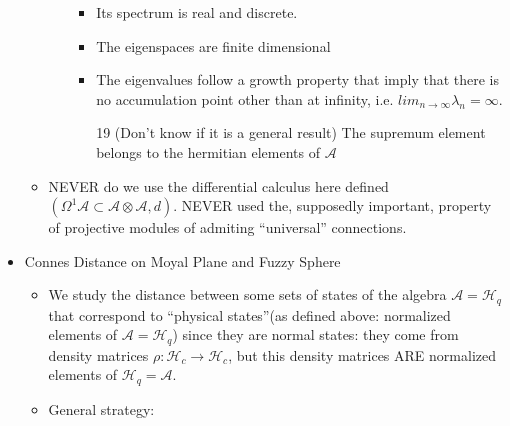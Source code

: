 \documentclass{article}
\begin{document}
\begin{itemize}
\begin{itemize}
\begin{itemize}
                \begin{itemize}
                    
                \item Its spectrum is real and discrete.
                
                \item The eigenspaces are finite dimensional
                
                \item The eigenvalues follow a growth property that imply that there is no accumulation point other than at infinity, i.e. $lim_{n \to \infty} \lambda_n = \infty$.
                
                \item [19] (Don't know if it is a general result) The supremum element belongs to the hermitian elements of $\mathcal A$
                    
                \end{itemize}
            
            \end{itemize}
            
            \item NEVER do we use the differential calculus here defined $(\Omega^1 \mathcal A \subset \mathcal A \otimes \mathcal A, d)$. NEVER used the, supposedly important, property of projective modules of admiting ``universal'' connections.
        
        \end{itemize}
    
    \item Connes Distance on Moyal Plane and Fuzzy Sphere
    
        \begin{itemize}
            
        \item We study the distance between some sets of states of the algebra $\mathcal A = \mathcal H_q$ that correspond to ``physical states''(as defined above: normalized elements of $\mathcal A = \mathcal H_q$) since they are normal states: they come from density matrices $\rho: \mathcal H_c \to \mathcal H_c$, but this density matrices ARE normalized elements of $\mathcal H_q = \mathcal A$.
        
        \item General strategy:
        
            \begin{itemize}
                

\end{itemize}
\end{itemize}
\end{itemize}
\end{document}

